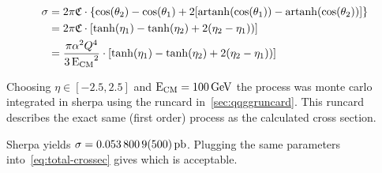 \begin{equation}
  \label{eq:total-crossec}
  \begin{split}
  \sigma &=
  2\pi\mathfrak{C}\cdot\qty{\cos(\theta_2)-\cos(\theta_1)+2\qty[\operatorname{artanh}(\cos(\theta_1))
    - \operatorname{artanh}(\cos(\theta_2))]} \\
  &=2\pi\mathfrak{C}\cdot\qty[\tanh(\eta_1) - \tanh(\eta_2) + 2(\eta_2
  - \eta_1))] \\
  &={\frac{\pi\alpha^2Q^4}{3\operatorname{E_{\text{CM}}}^2}}\cdot\qty[\tanh(\eta_1) - \tanh(\eta_2) + 2(\eta_2
  - \eta_1))]
  \end{split}
\end{equation}

Choosing \(\eta\in [-2.5,2.5]\) and
\(\operatorname{E_{\text{CM}}}=\SI{100}{\giga\electronvolt}\) the process was monte carlo
integrated in sherpa using the runcard in~\ref{sec:qqggruncard}. This
runcard describes the exact same (first order) process as the
calculated cross section.

Sherpa yields \(\sigma = \SI{0.0538009\pm
  .00005}{\pico\barn}\). Plugging the same parameters
into~\eqref{eq:total-crossec} gives  which is
acceptable.
